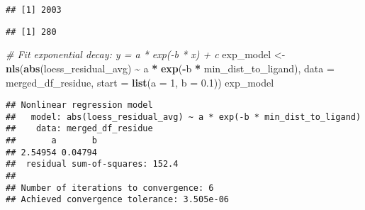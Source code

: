 \documentclass[
]{article}
\newenvironment{Shaded}{\begin{snugshade}}{\end{snugshade}}
\newcommand{\AttributeTok}[1]{\textcolor[rgb]{0.13,0.29,0.53}{#1}}
\newcommand{\CommentTok}[1]{\textcolor[rgb]{0.56,0.35,0.01}{\textit{#1}}}
\newcommand{\ConstantTok}[1]{\textcolor[rgb]{0.56,0.35,0.01}{#1}}
\newcommand{\DecValTok}[1]{\textcolor[rgb]{0.00,0.00,0.81}{#1}}
\newcommand{\FloatTok}[1]{\textcolor[rgb]{0.00,0.00,0.81}{#1}}
\newcommand{\FunctionTok}[1]{\textcolor[rgb]{0.13,0.29,0.53}{\textbf{#1}}}
\newcommand{\NormalTok}[1]{#1}
\newcommand{\OtherTok}[1]{\textcolor[rgb]{0.56,0.35,0.01}{#1}}
\newcommand{\SpecialCharTok}[1]{\textcolor[rgb]{0.81,0.36,0.00}{\textbf{#1}}}
\newcommand{\StringTok}[1]{\textcolor[rgb]{0.31,0.60,0.02}{#1}}
\begin{document}
\begin{verbatim}
## [1] 2003
\end{verbatim}

\begin{Shaded}
\end{Shaded}

\begin{verbatim}
## [1] 280
\end{verbatim}

\begin{Shaded}
\begin{Highlighting}[]
\CommentTok{\# Fit exponential decay: y = a * exp({-}b * x) + c}
\NormalTok{exp\_model }\OtherTok{\textless{}{-}} \FunctionTok{nls}\NormalTok{(}\FunctionTok{abs}\NormalTok{(loess\_residual\_avg) }\SpecialCharTok{\textasciitilde{}}\NormalTok{ a }\SpecialCharTok{*} \FunctionTok{exp}\NormalTok{(}\SpecialCharTok{{-}}\NormalTok{b }\SpecialCharTok{*}\NormalTok{ min\_dist\_to\_ligand),}
                 \AttributeTok{data =}\NormalTok{ merged\_df\_residue,}
                 \AttributeTok{start =} \FunctionTok{list}\NormalTok{(}\AttributeTok{a =} \DecValTok{1}\NormalTok{, }\AttributeTok{b =} \FloatTok{0.1}\NormalTok{))}
\NormalTok{exp\_model}
\end{Highlighting}
\end{Shaded}

\begin{verbatim}
## Nonlinear regression model
##   model: abs(loess_residual_avg) ~ a * exp(-b * min_dist_to_ligand)
##    data: merged_df_residue
##       a       b 
## 2.54954 0.04794 
##  residual sum-of-squares: 152.4
## 
## Number of iterations to convergence: 6 
## Achieved convergence tolerance: 3.505e-06
\end{verbatim}
\end{document}
